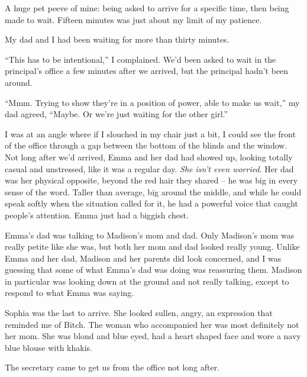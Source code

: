 





A huge pet peeve of mine: being asked to arrive for a specific time, then being made to wait.  Fifteen minutes was just about my limit of my patience.



My dad and I had been waiting for more than thirty minutes.



``This has to be intentional,'' I complained.  We'd been asked to wait in the principal's office a few minutes after we arrived, but the principal hadn't been around.



``Mmm.  Trying to show they're in a position of power, able to make us wait,'' my dad agreed, ``Maybe.  Or we're just waiting for the other girl.''



I was at an angle where if I slouched in my chair just a bit, I could see the front of the office through a gap between the bottom of the blinds and the window.  Not long after we'd arrived, Emma and her dad had showed up, looking totally casual and unstressed, like it was a regular day.  \emph{She isn't even worried}.  Her dad was her physical opposite, beyond the red hair they shared – he was big in every sense of the word.  Taller than average, big around the middle, and while he could speak softly when the situation called for it, he had a powerful voice that caught people's attention.  Emma just had a biggish chest.



Emma's dad was talking to Madison's mom and dad.  Only Madison's mom was really petite like she was, but both her mom and dad looked really young.  Unlike Emma and her dad, Madison and her parents did look concerned, and I was guessing that some of what Emma's dad was doing was reassuring them.  Madison in particular was looking down at the ground and not really talking, except to respond to what Emma was saying.



Sophia was the last to arrive.  She looked sullen, angry, an expression that reminded me of Bitch.  The woman who accompanied her was most definitely not her mom.  She was blond and blue eyed, had a heart shaped face and wore a navy blue blouse with khakis.



The secretary came to get us from the office not long after.



